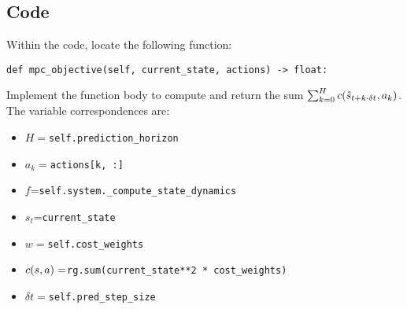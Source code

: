 \documentclass[12pt]{article}
\begin{document}
\subsection*{Code}
Within the code, locate the following function:
\begin{verbatim}
def mpc_objective(self, current_state, actions) -> float:
\end{verbatim}
Implement the function body to compute and return the sum $\sum_{k = 0}^H c(\hat{s}_{t+k\cdot \delta t}, a_k)$. 
The variable correspondences are:
\begin{itemize}
    \item $H=$\texttt{self.prediction\_horizon}
    \item $a_k=$\texttt{actions[k, :]}
    \item $f$=\texttt{self.system.\_compute\_state\_dynamics}
    \item $s_t$=\texttt{current\_state}
    \item $w=$\texttt{self.cost\_weights}
    \item $c(s, a)=$\texttt{rg.sum(current\_state**2 * cost\_weights)}
    \item $\delta t=$\texttt{self.pred\_step\_size} 
\end{itemize}
\end{document}
